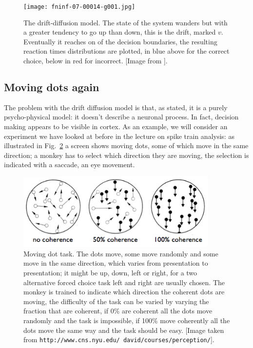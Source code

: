 \documentclass[11pt,a4paper]{scrartcl}
\begin{document}
\begin{figure}
\begin{center}
\texttt{[image: fninf-07-00014-g001.jpg]}
\end{center}
\caption{The drift-diffusion model. The state of the system wanders
  but with a greater tendency to go up than down, this is the drift,
  marked $v$. Eventually it reaches on of the decision boundaries, the
  resulting reaction times distributions are plotted, in blue above
  for the correct choice, below in red for incorrect. [Image from
    \cite{WieckiSoferFrank2013a}]. \label{fig:diffRT}}
\end{figure}

\subsection*{Moving dots again}

The problem with the drift diffusion model is that, as stated, it is a
purely psycho-physical model: it doesn't describe a neuronal
process. In fact, decision making appears to be visible in cortex. As
an example, we will consider an experiment we have looked at before in
the lecture on spike train analysis: as illustrated in
Fig.~\ref{fig:dots} a screen shows moving dots, some of which move in
the same direction; a monkey has to select which direction they are
moving, the selection is indicated with a saccade, an eye movement.

\begin{figure}
\begin{center}
\includegraphics[width=10cm]{motion.jpg}
\end{center}
\caption{Moving dot task. The dots move, some move randomly and some
  move in the same direction, which varies from presentation to
  presentation; it might be up, down, left or right, for a two
  alternative forced choice task left and right are usually
  chosen. The monkey is trained to indicate which direction the
  coherent dots are moving, the difficulty of the task can be varied
  by varying the fraction that are coherent, if 0\% are coherent all
  the dots move randomly and the task is impossible, if 100\% move
  coherently all the dots move the same way and the task should be
  easy. [Image taken from
    \texttt{http://www.cns.nyu.edu/~david/courses/perception/}].\label{fig:dots}}
\end{figure}
\end{document}
